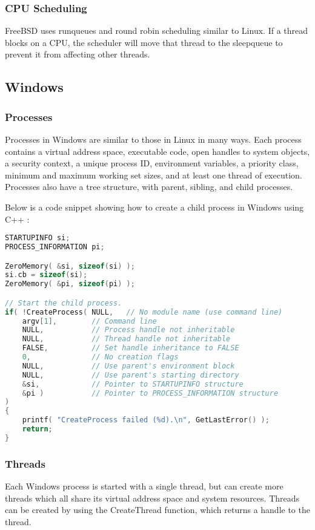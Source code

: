 \documentclass[letterpaper,draftclsnofoot,10pt,onecolumn,titlepage]{IEEEtran}\usepackage[margin=0.75in]{geometry}
\begin{document}
        \subsubsection{CPU Scheduling}
        FreeBSD uses runqueues and round robin scheduling similar to Linux. If a thread blocks on a CPU, the scheduler
        will move that thread to the sleepqueue to prevent it from affecting other threads.

    \subsection{Windows}
        \subsubsection{Processes}
        Processes in Windows are similar to those in Linux in many ways. Each process contains a virtual address space,
        executable code, open handles to system objects, a security context, a unique process ID, environment variables,
        a priority class, minimum and maximum working set sizes, and at least one thread of execution. Processes also
        have a tree structure, with parent, sibling, and child processes.

        Below is a code snippet showing how to create a child process in Windows using C++ \cite{windowsprocesses}:
\begin{lstlisting}[language=C++]
STARTUPINFO si;
PROCESS_INFORMATION pi;

ZeroMemory( &si, sizeof(si) );
si.cb = sizeof(si);
ZeroMemory( &pi, sizeof(pi) );

// Start the child process.
if( !CreateProcess( NULL,   // No module name (use command line)
    argv[1],        // Command line
    NULL,           // Process handle not inheritable
    NULL,           // Thread handle not inheritable
    FALSE,          // Set handle inheritance to FALSE
    0,              // No creation flags
    NULL,           // Use parent's environment block
    NULL,           // Use parent's starting directory
    &si,            // Pointer to STARTUPINFO structure
    &pi )           // Pointer to PROCESS_INFORMATION structure
)
{
    printf( "CreateProcess failed (%d).\n", GetLastError() );
    return;
}
\end{lstlisting}

        \subsubsection{Threads}
        Each Windows process is started with a single thread, but can create more threads which all share its virtual
        address space and system resources. Threads can be created by using the CreateThread function, which returns a
        handle to the thread.
\end{document}
